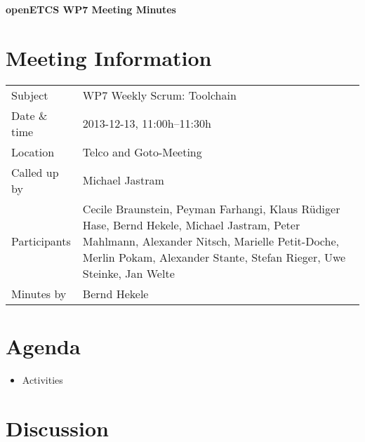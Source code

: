 \documentclass[a4paper, 11pt]{article}
\begin{document}
{\begin{center}\huge\bf openETCS WP7 Meeting Minutes\end{center}}
\section{Meeting Information}

\renewcommand{\arraystretch}{1.5}
\begin{supertabular}{m{.2\textwidth}m{.8\textwidth}}
Subject & WP7 Weekly Scrum: Toolchain\\
Date \& time & 2013-12-13, 11:00h--11:30h\\
Location & Telco and Goto-Meeting\\
Called up by & Michael Jastram\\
Participants &
Cecile Braunstein,
Peyman Farhangi,
Klaus R\"udiger Hase,
Bernd Hekele,
Michael Jastram,
Peter Mahlmann,
Alexander Nitsch,
Marielle Petit-Doche,
Merlin Pokam,
Alexander Stante,
Stefan Rieger,
Uwe Steinke,
Jan Welte
\\

Minutes by & Bernd Hekele\\

\end{supertabular}
\renewcommand{\arraystretch}{1.0}


\section{Agenda}
\begin{itemize}
\item Activities
\end{itemize}

\section{Discussion}
\end{document}
